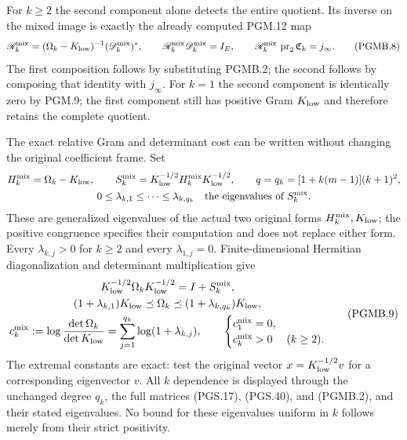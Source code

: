 For $k\geq2$ the second component alone detects the entire
quotient. Its inverse on the mixed image is exactly the
already computed PGM.12 map
\[
 \mathscr R_k^{\rm mix}
 = (\Omega_k-K_{\rm low})^{-1}(\mathscr D_k^{\rm mix})^*,
 \qquad
 \mathscr R_k^{\rm mix}\mathscr D_k^{\rm mix}=I_E,
 \qquad
 \mathscr R_k^{\rm mix}\,\operatorname{pr}_2\mathfrak C_k
                                  =j_\infty.
 \tag{PGMB.8}\label{eq:pgmb-mixed-inverse-composite}
\]
The first composition follows by substituting PGMB.2; the
second follows by composing that identity with $j_\infty$.
For $k=1$ the second component is identically zero by PGM.9;
the first component still has positive Gram $K_{\rm low}$
and therefore retains the complete quotient.

The exact relative Gram and determinant cost can be written
without changing the original coefficient frame. Set
\[
 \begin{gathered}
 H_k^{\rm mix}=\Omega_k-K_{\rm low},\qquad
 S_k^{\rm mix}=K_{\rm low}^{-1/2}H_k^{\rm mix}K_{\rm low}^{-1/2},\qquad
 q=q_k=[1+k(m-1)](k+1)^2,\\
 0\leq\lambda_{k,1}\leq\cdots\leq\lambda_{k,q_k}
       \quad\hbox{the eigenvalues of }S_k^{\rm mix}.
 \end{gathered}
\]
These are generalized eigenvalues of the actual two original
forms $H_k^{\rm mix},K_{\rm low}$; the positive congruence
specifies their computation and does not replace either form.
Every $\lambda_{k,j}>0$ for $k\geq2$ and every
$\lambda_{1,j}=0$. Finite-dimensional Hermitian diagonalization
and determinant multiplication give
\[
 \begin{gathered}
 K_{\rm low}^{-1/2}\Omega_kK_{\rm low}^{-1/2}
                                     =I+S_k^{\rm mix},\\
 (1+\lambda_{k,1})K_{\rm low}\preceq\Omega_k
             \preceq(1+\lambda_{k,q_k})K_{\rm low},\\
 c_k^{\rm mix}:=\log\frac{\det\Omega_k}{\det K_{\rm low}}
       =\sum_{j=1}^{q_k}\log(1+\lambda_{k,j}),\qquad
 \begin{cases}c_1^{\rm mix}=0,\\c_k^{\rm mix}>0& (k\geq2).
 \end{cases}
 \end{gathered}
 \tag{PGMB.9}\label{eq:pgmb-relative-cost}
\]
The extremal constants are exact: test the original vector
$x=K_{\rm low}^{-1/2}v$ for a corresponding eigenvector $v$.
All $k$ dependence is displayed through the unchanged degree
$q_k$, the full matrices (PGS.17), (PGS.40), and (PGMB.2),
and their stated eigenvalues. No bound for these eigenvalues
uniform in $k$ follows merely from their strict positivity.

